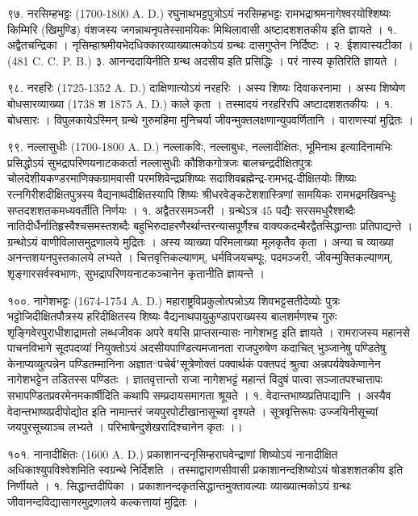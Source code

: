९७. नरसिम्हभट्टः (1700-1800 A. D.)
रघुनाथभट्टपुत्रोऽयं नरसिम्हभट्टः रामभद्राश्रमनागेश्वरयोश्शिष्यः किम्मिरि (खिमुण्डि) वंशजस्य जगन्नाथनृपतेस्सामयिकः मिथिलावासी अष्टादशशतकीय इति ज्ञायते ।
१. अद्वैतचन्द्रिका । नृसिम्हाश्रमीयभेदधिक्कारव्याख्यात्मकोऽयं ग्रन्थः दासगुप्तेन निर्दिष्टः ।
२. ईशावास्यटीका । (481 C. C. P. B.) 
३. आनन्ददायिनीति ग्रन्थ अदसीय इति प्रसिद्धिः । परं नास्य कृतिरिति ज्ञायते ।

९८. नरहरिः (1725-1352 A. D.)
दाक्षिणात्योऽयं नरहरिः । अस्य शिष्यः दिवाकरनामा । अस्य शिष्येण बोधसारव्याख्या (1738 श 1875 A. D.) काले कृता । तस्मादयं नरहरिरपि अष्टादशशतकीयः ।
१. बोधसारः । विपुलकायेऽस्मिन् ग्रन्थे गुरुमहिमा मुनिचर्या जीवन्मुक्तलक्षणान्युपवर्णितानि । वाराणस्यां मुद्रितः ।

९९. नल्लासुधीः (1700-1800 A. D.)
नल्लाकविः, नल्लाबुधः, नल्लादीक्षितः, भूमिनाथ इत्यादिनामभिः प्रसिद्धोऽयं सुभद्रापरिणयनाटककर्ता नल्लासुधीः कौशिकगोत्रजः बालचन्द्रदीक्षितपुत्रः चोलदेशीयकण्डरमाणिक्कग्रामवासी परमशिवेन्द्रप्रशिष्यः सदाशिवब्रह्मेन्द्र-रामभद्र-दीक्षितयोः शिष्यः रत्नगिरीशदीक्षितपुत्रस्य वैद्यनाथदीक्षितस्यापि शिष्यः श्रीधरवेङ्कटेशशास्त्रिणां सामयिकः रामभद्रमखिवन्धुः सप्तदशशतकमध्यवर्तीति निर्णयः ।
१. अद्वैतरसमञ्जरी । ग्रन्थेऽत्र 45 पद्यैः सरसमधुरैश्शब्दैः नातिदीर्धैर्नातिहृस्वैश्चसमस्तशब्दैः बहुभिरुदाहरणैरर्थान्तरन्यासपूर्णैश्च वाक्यकदम्बैरद्वैतसिद्धान्ताः प्रतिपाद्यन्ते । ग्रन्थोऽयं वाणीविलासमुद्रणालये मुद्रितः । अस्य व्याख्या परिमलाख्या मूलकृतैव कृता । अन्या च व्याख्या अनन्तशयनपुस्तकालये लभ्यते ।
चित्तवृत्तिकल्याणम्, धर्मविजयचम्पूः, पदमञ्जरी, जीवन्मुक्तिकल्याणम्, शृङ्गारसर्वस्वभाणः, सुभद्रापरिणयनाटकञ्चानेन कृतानीति ज्ञायन्ते ।

१००. नागेशभट्टः (1674-1754 A. D.)
महाराष्ट्रविप्रकुलोत्पन्नोऽय शिवभट्टसतीदेव्योः पुत्रः भट्टोजिदीक्षितपौत्रस्य हरिदीक्षितस्य शिष्यः वैद्यनाथपायुकुण्डापराख्यस्य बालशर्मणश्च गुरुः शृङ्गिवेरपुराधीशाद्रामतो लब्धजीवक अपरे वयसि प्राप्तसन्यासः नागेशभट्ट इति ज्ञायते ।
रामराजस्य महानसे पाचनविभागे सूदपदव्यां नियुक्तोऽयं अदसीयपाण्डित्यमजानता राजपुरुषेण कदाचित् भुञ्जानेषु पण्डितेषु केनाप्यव्युत्पन्नेन पण्डितम्मानिना अज्ञात``पचेर्ब"सूत्रेणोक्तं पक्वार्थकं पक्तपदं श्रुत्वा अन्नपर्यवेषकेणानेन नागेशभट्टेन तडितस्स पण्डितः । ज्ञातवृत्तान्तो राजा नागेशभट्टं महान्तं विदुषं पात्वा सञ्जातपश्चात्तापः सभापण्डितप्रवरमेनमकार्षीदिति कथापि सम्प्रदायसमागता श्रूयते ।
१. वेदान्तभाष्यप्रतिपाद्यानि । अस्यैव वेदान्तभाष्यप्रदीपोद्योत इति नामान्तरं जयपुरपोटीखानासूच्यां दृश्यते । सूत्रवृत्तिरूपः उज्जयिनीसूच्यां जयपुरसूच्याञ्च लभ्यते । परिभाषेन्दुशेखरादिश्चानेन कृतः ।।

१०१. नानादीक्षितः (1600 A. D.)
प्रकाशानन्दनृसिम्हराघवेन्द्राणां शिष्योऽयं नानादीक्षित अधिकाश्युपविश्वेशमिति स्वग्रन्थे निर्दिशति । तस्माद्वाराणसीवासी प्रकाशानन्दशिष्योऽयं षोडशशतकीय इति निर्णीयते ।
१. सिद्धान्तदीपिका । प्रकाशानन्दकृतसिद्धान्तमुक्तावल्याः व्याख्यात्मकोऽयं ग्रन्थः जीवानन्दविद्यासागरमुद्रणालये कल्कत्तायां मुद्रितः ।

